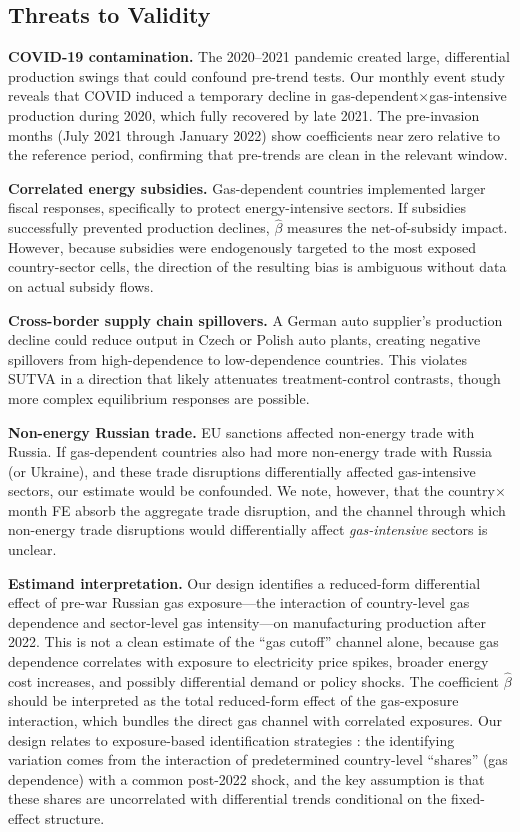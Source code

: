 \documentclass[12pt]{article}
\begin{document}
\subsection{Threats to Validity}

\textbf{COVID-19 contamination.} The 2020--2021 pandemic created large, differential production swings that could confound pre-trend tests. Our monthly event study reveals that COVID induced a temporary decline in gas-dependent$\times$gas-intensive production during 2020, which fully recovered by late 2021. The pre-invasion months (July 2021 through January 2022) show coefficients near zero relative to the reference period, confirming that pre-trends are clean in the relevant window.

\textbf{Correlated energy subsidies.} Gas-dependent countries implemented larger fiscal responses, specifically to protect energy-intensive sectors. If subsidies successfully prevented production declines, $\hat{\beta}$ measures the net-of-subsidy impact. However, because subsidies were endogenously targeted to the most exposed country-sector cells, the direction of the resulting bias is ambiguous without data on actual subsidy flows.

\textbf{Cross-border supply chain spillovers.} A German auto supplier's production decline could reduce output in Czech or Polish auto plants, creating negative spillovers from high-dependence to low-dependence countries. This violates SUTVA in a direction that likely attenuates treatment-control contrasts, though more complex equilibrium responses are possible.

\textbf{Non-energy Russian trade.} EU sanctions affected non-energy trade with Russia. If gas-dependent countries also had more non-energy trade with Russia (or Ukraine), and these trade disruptions differentially affected gas-intensive sectors, our estimate would be confounded. We note, however, that the country$\times$month FE absorb the aggregate trade disruption, and the channel through which non-energy trade disruptions would differentially affect \textit{gas-intensive} sectors is unclear.

\textbf{Estimand interpretation.} Our design identifies a reduced-form differential effect of pre-war Russian gas exposure---the interaction of country-level gas dependence and sector-level gas intensity---on manufacturing production after 2022. This is not a clean estimate of the ``gas cutoff'' channel alone, because gas dependence correlates with exposure to electricity price spikes, broader energy cost increases, and possibly differential demand or policy shocks. The coefficient $\hat{\beta}$ should be interpreted as the total reduced-form effect of the gas-exposure interaction, which bundles the direct gas channel with correlated exposures. Our design relates to exposure-based identification strategies \citep{goldsmith2020,borusyak2022}: the identifying variation comes from the interaction of predetermined country-level ``shares'' (gas dependence) with a common post-2022 shock, and the key assumption is that these shares are uncorrelated with differential trends conditional on the fixed-effect structure.
\end{document}
